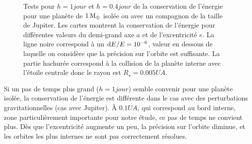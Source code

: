 \begin{figure}[htbp]
\centering
{}\hfill
{}

\hfill
{}


\caption[Conservation de l'énergie en fonction du pas de temps et des conditions initiales.]{Tests pour $h=1\unit{jour}$ et
$h=0.4\unit{jour}$ de la conservation de l'énergie pour une planète de $1\mathrm{\thinspace M_\oplus}$ isolée ou avec un compagnon de la taille de
Jupiter. Les cartes montrent la conservation de l'énergie pour différentes valeurs du demi-grand axe $a$ et de l'excentricité
$e$. La ligne noire correspond à un $\operatorname{d \!} E/E=10^{-6}$, valeur en dessous de laquelle on considère que la précision sur l'orbite
est suffisante. La partie hachurée correspond à la collision de la planète interne avec l'étoile centrale donc le rayon est
$R_\star=0.005\unit{UA}$.}\label{fig:accuracy_maps}
\end{figure}

Si un pas de temps plus grand ($h=1\unit{jour}$) semble convenir pour une planète isolée, la conservation de l'énergie est
différente dans le cas avec des perturbations gravitationnelles (cas avec Jupiter). À $0.1\unit{UA}$, qui correspond au bord
interne, zone particulièrement importante pour notre étude, ce pas de temps ne convient plus. Dès que l'excentricité augmente un
peu, la précision sur l'orbite diminue, et les orbites les plus internes ne sont pas correctement résolues.

